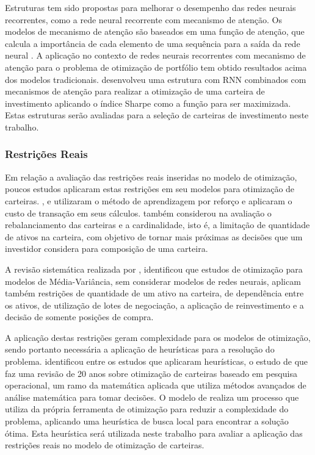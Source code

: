             \ipar Estruturas tem sido propostas para melhorar o desempenho das redes neurais recorrentes, como a rede neural recorrente com mecanismo de atenção. Os modelos de mecanismo de atenção são baseados em uma função de atenção, que calcula a importância de cada elemento de uma sequência para a saída da rede neural \cite{bahdanau2015neural}\cite{luong2015effective}\cite{vaswani2017attention}. A aplicação no contexto de redes neurais recorrentes com mecanismo de atenção para o problema de otimização de portfólio tem obtido resultados acima dos modelos tradicionais.  desenvolveu uma estrutura com \acrshort{RNN} combinados com mecanismos de atenção para realizar a otimização de uma carteira de investimento aplicando o índice Sharpe como a função para ser maximizada. Estas estruturas serão avaliadas para a seleção de carteiras de investimento neste trabalho.
        
        \subsubsection{Restrições Reais}
            
            \ipar Em relação a avaliação das restrições reais inseridas no modelo de otimização, poucos estudos aplicaram estas restrições em seu modelos para otimização de carteiras. ,  e  utilizaram o método de aprendizagem por reforço e aplicaram o custo de transação em seus cálculos.  também considerou na avaliação o rebalanciamento das carteiras e a cardinalidade, isto é, a limitação de quantidade de ativos na carteira, com objetivo de tornar mais próximas as decisões que um investidor considera para composição de uma carteira.

            \ipar A revisão sistemática realizada por , identificou que estudos de otimização para modelos de Média-Variância, sem considerar modelos de redes neurais, aplicam também restrições de quantidade de um ativo na carteira, de dependência entre os ativos, de utilização de lotes de negociação, a aplicação de reinvestimento e a decisão de somente posições de compra. 

            \ipar A aplicação destas restrições geram complexidade para os modelos de otimização, sendo portanto necessária a aplicação de heurísticas para a resolução do problema.  identificou entre os estudos que aplicaram heurísticas, o estudo de  que faz uma revisão de 20 anos sobre otimização de carteiras baseado em pesquisa operacional, um ramo da matemática aplicada que utiliza métodos avançados de análise matemática para tomar decisões. O modelo de  realiza um processo que utiliza da própria ferramenta de otimização para reduzir a complexidade do problema, aplicando uma heurística de busca local para encontrar a solução ótima. Esta heurística será utilizada neste trabalho para avaliar a aplicação das restrições reais no modelo de otimização de carteiras.

